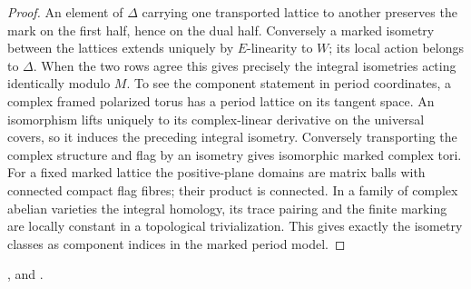\begin{proof}
An element of \(\Delta\) carrying one transported lattice to another
preserves the mark on the first half, hence on the dual half.
Conversely a marked isometry between the lattices extends uniquely
by \(E\)-linearity to \(W\); its local action belongs to \(\Delta\).
When the two rows agree this gives precisely the integral isometries
acting identically modulo \(M\). To see the component statement in
period coordinates, a complex framed polarized torus has a period
lattice on its tangent space. An isomorphism lifts uniquely to its
complex-linear derivative on the universal covers, so it induces
the preceding integral isometry. Conversely transporting the
complex structure and flag by an isometry gives isomorphic marked
complex tori. For a fixed marked lattice the positive-plane domains
are matrix balls with connected compact flag fibres; their product
is connected. In a family of complex abelian varieties the integral
homology, its trace pairing and the finite marking are locally
constant in a topological trivialization. This gives exactly the
isometry classes as component indices in the marked period model.
\end{proof}
,
 and
.

